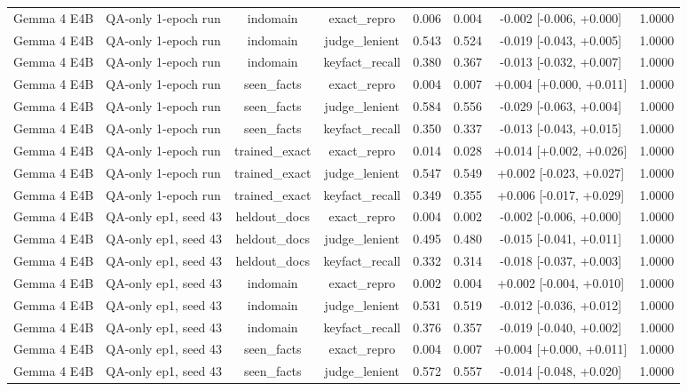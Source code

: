 \begin{table}[t]
{\begin{tabular}{llcccccc}
Gemma 4 E4B & QA-only 1-epoch run & indomain & exact\_repro & 0.006 & 0.004 & -0.002 [-0.006, +0.000] & 1.0000 \\
Gemma 4 E4B & QA-only 1-epoch run & indomain & judge\_lenient & 0.543 & 0.524 & -0.019 [-0.043, +0.005] & 1.0000 \\
Gemma 4 E4B & QA-only 1-epoch run & indomain & keyfact\_recall & 0.380 & 0.367 & -0.013 [-0.032, +0.007] & 1.0000 \\
Gemma 4 E4B & QA-only 1-epoch run & seen\_facts & exact\_repro & 0.004 & 0.007 & +0.004 [+0.000, +0.011] & 1.0000 \\
Gemma 4 E4B & QA-only 1-epoch run & seen\_facts & judge\_lenient & 0.584 & 0.556 & -0.029 [-0.063, +0.004] & 1.0000 \\
Gemma 4 E4B & QA-only 1-epoch run & seen\_facts & keyfact\_recall & 0.350 & 0.337 & -0.013 [-0.043, +0.015] & 1.0000 \\
Gemma 4 E4B & QA-only 1-epoch run & trained\_exact & exact\_repro & 0.014 & 0.028 & +0.014 [+0.002, +0.026] & 1.0000 \\
Gemma 4 E4B & QA-only 1-epoch run & trained\_exact & judge\_lenient & 0.547 & 0.549 & +0.002 [-0.023, +0.027] & 1.0000 \\
Gemma 4 E4B & QA-only 1-epoch run & trained\_exact & keyfact\_recall & 0.349 & 0.355 & +0.006 [-0.017, +0.029] & 1.0000 \\
Gemma 4 E4B & QA-only ep1, seed 43 & heldout\_docs & exact\_repro & 0.004 & 0.002 & -0.002 [-0.006, +0.000] & 1.0000 \\
Gemma 4 E4B & QA-only ep1, seed 43 & heldout\_docs & judge\_lenient & 0.495 & 0.480 & -0.015 [-0.041, +0.011] & 1.0000 \\
Gemma 4 E4B & QA-only ep1, seed 43 & heldout\_docs & keyfact\_recall & 0.332 & 0.314 & -0.018 [-0.037, +0.003] & 1.0000 \\
Gemma 4 E4B & QA-only ep1, seed 43 & indomain & exact\_repro & 0.002 & 0.004 & +0.002 [-0.004, +0.010] & 1.0000 \\
Gemma 4 E4B & QA-only ep1, seed 43 & indomain & judge\_lenient & 0.531 & 0.519 & -0.012 [-0.036, +0.012] & 1.0000 \\
Gemma 4 E4B & QA-only ep1, seed 43 & indomain & keyfact\_recall & 0.376 & 0.357 & -0.019 [-0.040, +0.002] & 1.0000 \\
Gemma 4 E4B & QA-only ep1, seed 43 & seen\_facts & exact\_repro & 0.004 & 0.007 & +0.004 [+0.000, +0.011] & 1.0000 \\
Gemma 4 E4B & QA-only ep1, seed 43 & seen\_facts & judge\_lenient & 0.572 & 0.557 & -0.014 [-0.048, +0.020] & 1.0000 \\

\end{tabular}}
\end{table}
